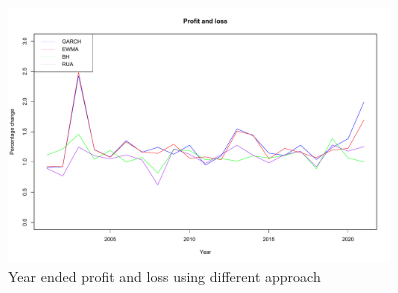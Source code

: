 \documentclass[11pt,a4paper]{article}
\begin{document}
 
    \begin{figure}[!ht]
        \centering
        \includegraphics[width = 0.9\textwidth]{plot/PCA/2.pdf}
        \caption{Year ended profit and loss using different approach}
        \label{fig:Fig.2}
    \end{figure}
    
\end{document}
